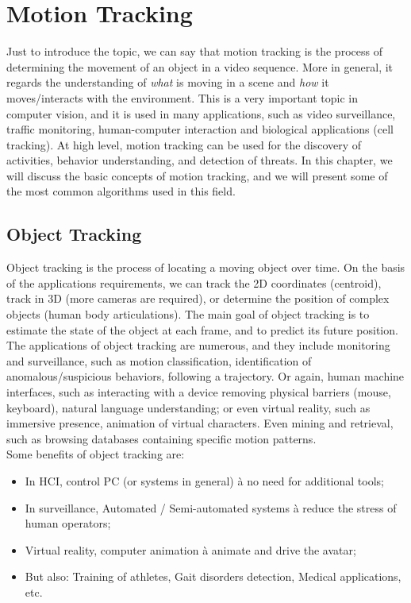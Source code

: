 \chapter{Motion Tracking}
Just to introduce the topic, we can say that motion tracking is the process of determining the movement of an object in a video sequence. 
More in general, it regards the understanding of \textit{what} is moving in a scene and \textit{how} it moves/interacts with the environment.
This is a very important topic in computer vision, and it is used in many applications, such as video surveillance, traffic monitoring, human-computer interaction and biological applications (cell tracking). 
At high level, motion tracking can be used for the discovery of activities, behavior understanding, and detection of threats.
In this chapter, we will discuss the basic concepts of motion tracking, and we will present some of the most common algorithms used in this field.

\section{Object Tracking}
Object tracking is the process of locating a moving object over time. On the basis of the applications requirements, we can track the 2D coordinates (centroid), track in 3D (more cameras are required), or determine the position of complex objects (human body articulations).
The main goal of object tracking is to estimate the state of the object at each frame, and to predict its future position.
The applications of object tracking are numerous, and they include monitoring and surveillance, such as motion classification, identification of anomalous/suspicious behaviors, following a trajectory. 
Or again, human machine interfaces, such as interacting with a device removing physical barriers (mouse, keyboard), natural language understanding; or even virtual reality, such as immersive presence, animation of virtual characters.
Even mining and retrieval, such as browsing databases containing specific motion patterns.
\\
Some benefits of object tracking are:
\begin{itemize}
\item In HCI, control PC (or systems in general) à no need for additional tools;
\item In surveillance, Automated / Semi-automated systems à reduce the stress of human operators;
\item Virtual reality, computer animation à animate and drive the avatar;
\item But also: Training of athletes, Gait disorders detection, Medical applications, etc.
\end{itemize}

